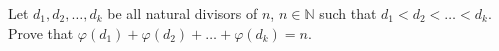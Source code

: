 Let $d_{1},d_{2},\ldots,d_{k}$ be all natural divisors of $n$, $n\in\mathbb{N}$ such that $d_{1}<d_{2}<\ldots<d_{k}$. Prove that $\varphi(d_{1})+\varphi(d_{2})+\ldots+\varphi(d_{k})=n$. 
